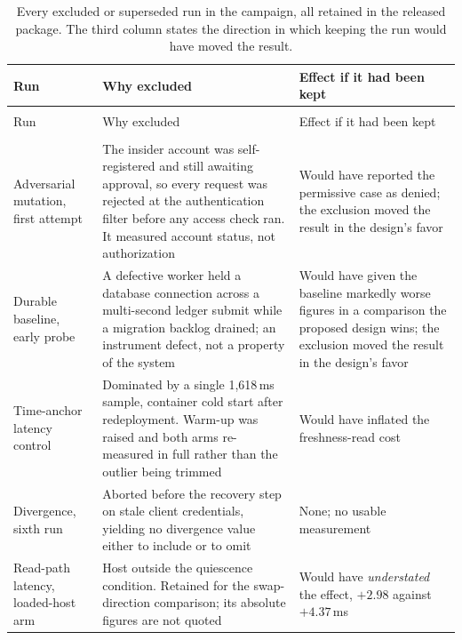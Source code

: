 \documentclass[preprint,12pt]{elsarticle}
\begin{document}
{\scriptsize
\setlength{\tabcolsep}{4pt}
\begin{longtable}{@{}>{\raggedright\arraybackslash}p{}%
                 >{\raggedright\arraybackslash}p{}%
                 >{\raggedright\arraybackslash}p{}@{}}
\caption{Every excluded or superseded run in the campaign, all retained in
the released package. The third column states the direction in which keeping
the run would have moved the result.}
\label{tab:excluded} \\
\toprule
Run & Why excluded & Effect if it had been kept \\
\midrule
\endfirsthead
\multicolumn{3}{@{}l}{\emph{Table~\ref{tab:excluded}, continued}}\\
\toprule
Run & Why excluded & Effect if it had been kept \\
\midrule
\endhead
\bottomrule
\multicolumn{3}{@{}l}{\emph{continues on the next page}}\\
\endfoot
\bottomrule
\endlastfoot
Adversarial mutation, first attempt &
The insider account was self-registered and still awaiting approval, so every
request was rejected at the authentication filter before any access check ran.
It measured account status, not authorization &
Would have reported the permissive case as denied; the exclusion moved the
result in the design's favor \\
\addlinespace
Durable baseline, early probe &
A defective worker held a database connection across a multi-second ledger
submit while a migration backlog drained; an instrument defect, not a property
of the system &
Would have given the baseline markedly worse figures in a comparison the
proposed design wins; the exclusion moved the result in the design's favor \\
\addlinespace
Time-anchor latency control &
Dominated by a single 1{,}618\,ms sample, container cold start after
redeployment. Warm-up was raised and both arms re-measured in full rather than
the outlier being trimmed &
Would have inflated the freshness-read cost \\
\addlinespace
Divergence, sixth run &
Aborted before the recovery step on stale client credentials, yielding no
divergence value either to include or to omit &
None; no usable measurement \\
\addlinespace
Read-path latency, loaded-host arm &
Host outside the quiescence condition. Retained for the swap-direction
comparison; its absolute figures are not quoted &
Would have \emph{understated} the effect, $+2.98$ against $+4.37$\,ms \\

\end{longtable}}
\end{document}

